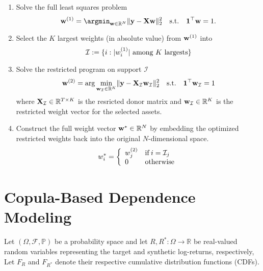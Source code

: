 \begin{enumerate}
\item Solve the full least squares problem
%
\begin{equation*}
\mathbf{w}^{(1)} = \argmin_{\mathbf{w} \in \mathbb{R}^{N}} \norm{\mathbf{y} - \mathbf{X}\mathbf{w}}_2^2
\quad \text{s.t.} \quad \mathbf{1}^\top \mbf w=1.
\end{equation*}
%
\item Select the $K$ largest weights (in absolute value) from $\mbf w^{(1)}$ into
$$\mathcal I:=\{i : |w_i^{(1)}| \t{~among $K$ largests}\}$$
%
\item Solve the restricted program on support $\mathcal I$
%
\begin{equation*}
	\mbf w^{(2)} = \arg \min_{\mbf w_{\mathcal I}\in \mathbb{R}^K} \norm{\mbf y - \mbf X_{\mathcal I}\mbf w_{\mathcal I}}_{2}^{2}
\quad \text{s.t.} \quad 
\mbf 1\' \mbf w_{\mathcal I} = 1
\end{equation*}
%
where $\mbf X_{\mathcal{I}} \in \mathbb{R}^{T \times K}$ is the resricted donor matrix and $\mbf w_{\mathcal{I}} \in \mathbb{R}^{K}$ is the restricted weight vector for the selected assets.
%
\item Construct the full weight vector $\mbf w^* \in \mathbb{R}^{N}$ by embedding the optimized restricted weights back into the original $N$-dimensional space. 
\begin{equation*}
	w^*_i = 
\mycases{llll}{
w^{(2)}_j & \IF  i = \mathcal I_j
\\
0 & \text{otherwise}
}
\end{equation*}
\end{enumerate}


\section{Copula-Based Dependence Modeling}


Let $(\Omega, \mathcal{F}, \mathbb{P})$ be a probability space and let $R, R^*: \Omega \to \mathbb{R}$ be real-valued random variables representing the target and synthetic log-returns, respectively, 
Let $F_R$ and $F_{R^*}$ denote their respective cumulative distribution functions (CDFs).

